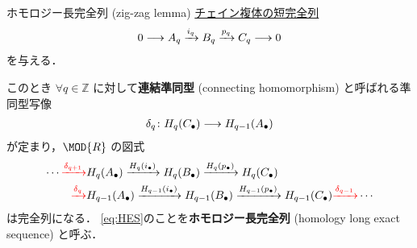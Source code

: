 \documentclass[algtopo_main]{subfiles}
\begin{document}
\begin{myprop}[label=prop:HES, breakable]{ホモロジー長完全列 (zig-zag lemma)}
    \hyperref[def:chain-exact]{チェイン複体の短完全列}
    \begin{align}
        0 \longrightarrow A_q \xrightarrow{i_q} B_q \xrightarrow{p_q} C_q \longrightarrow 0
    \end{align}
    を与える．

    このとき $\forall q \in \mathbb{Z}$ に対して\textbf{連結準同型} (connecting homomorphism) と呼ばれる準同型写像
    \begin{align}
        \label{eq:connecting}
        \delta_q \colon H_q(C_\bullet) \longrightarrow H_{q-1}(A_\bullet)
    \end{align}
    が定まり，$\MOD{R}$ の図式
    \begin{align}
        \label{eq:HES}
        \cdots \textcolor{red}{\xrightarrow{\delta_{q+1}}} &H_q(A_\bullet) \xrightarrow{H_q(i_\bullet)} H_q(B_\bullet) \xrightarrow{H_q(p_\bullet)} H_q(C_\bullet) \\
        \textcolor{red}{\xrightarrow{\delta_q}} &H_{q-1}(A_\bullet) \xrightarrow{H_{q-1}(i_\bullet)} H_{q-1}(B_\bullet) \xrightarrow{H_{q-1}(p_\bullet)} H_{q-1}(C_\bullet)
        \textcolor{red}{\xrightarrow{\delta_{q-1}}} \cdots
    \end{align}
    は完全列になる．
    \eqref{eq:HES}のことを\textbf{ホモロジー長完全列} (homology long exact sequence) と呼ぶ．
\end{myprop}
\end{document}
